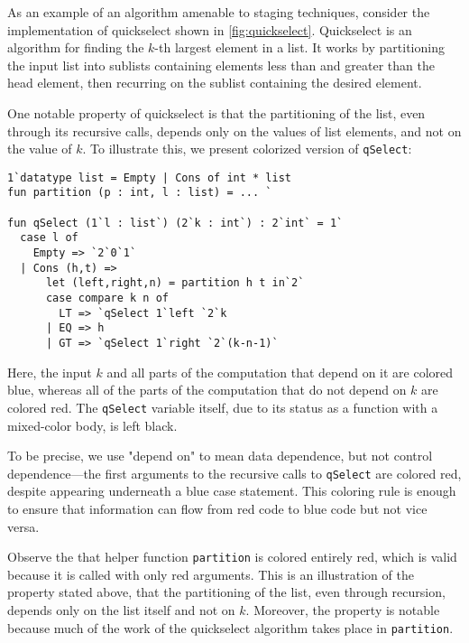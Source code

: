 As an example of an algorithm amenable to staging techniques,
consider the implementation of quickselect shown in \ref{fig:quickselect}.
Quickselect is an algorithm for finding the $k$-th largest element in a list.
It works by partitioning the input list into sublists containing elements less than and greater than the head element, 
then recurring on the sublist containing the desired element.



One notable property of quickselect is that the partitioning of the list, 
even through its recursive calls, depends only on the values of list elements, and not on the value of $k$.
To illustrate this, we present colorized version of \texttt{qSelect}:

\begin{lstlisting} 
1`datatype list = Empty | Cons of int * list
fun partition (p : int, l : list) = ... `

fun qSelect (1`l : list`) (2`k : int`) : 2`int` = 1`
  case l of
    Empty => `2`0`1`
  | Cons (h,t) => 
      let (left,right,n) = partition h t in`2`
      case compare k n of
        LT => `qSelect 1`left `2`k
      | EQ => h
      | GT => `qSelect 1`right `2`(k-n-1)`
\end{lstlisting}

Here, the input $k$ and all parts of the computation that depend on it are colored blue,
whereas all of the parts of the computation that do not depend on $k$ are colored red.
The \texttt{qSelect} variable itself, due to its status as a function with a mixed-color body, is left black.


To be precise, we use "depend on" to mean data dependence, but not control dependence---the 
first arguments to the recursive calls to \texttt{qSelect} are colored red,
despite appearing underneath a blue case statement.
This coloring rule is enough to ensure that information can flow from red code to blue code but not vice versa.

Observe the that helper function \texttt{partition} is colored entirely red,
which is valid because it is called with only red arguments.  
This is an illustration of the property stated above, that 
the partitioning of the list, even through recursion, depends only on the list itself and not on $k$.
Moreover, the property is notable because much of the work of the quickselect algorithm takes place in \texttt{partition}.

